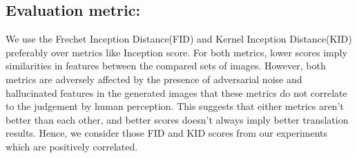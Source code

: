 \documentclass[a4paper,twoside]{article}
\begin{document}
\subsection{Evaluation metric:}
\label{evaluation metric}
\noindent
We use the Frechet Inception Distance(FID) \cite{FID_HeuselRUNKH17} and Kernel Inception Distance(KID) \cite{KID_MMD_GAN} preferably over metrics like Inception score. For both metrics, lower scores imply similarities in features between the compared sets of images. However, both metrics are adversely affected by the presence of adversarial noise and hallucinated features in the generated images that these metrics do not correlate to the judgement by human perception. This suggests that either metrics aren't better than each other, and better scores doesn't always imply better translation results. Hence, we consider those FID and KID scores from our experiments which are positively correlated. 
\begin{table}[!hb]
\centering
\caption{KID  100  std.  100 compared for different methods \cite{DiscoGAN_KimCKLK17}, \cite{Residual-Attention_WangJQYLZWT17}, \cite{DualGAN_YiZTG17}, \cite{UNIT_LiuBK17}, \cite{CycleGAN2017}, \cite{Mejjati2018UAIT}, \cite{attentionGAN}(from left to right). Abbreviations: (H)orse, (Z)ebra (A)pple, (O)range.}
\label{tab:KID score comparison on various methods}
\end{table}
\end{document}
